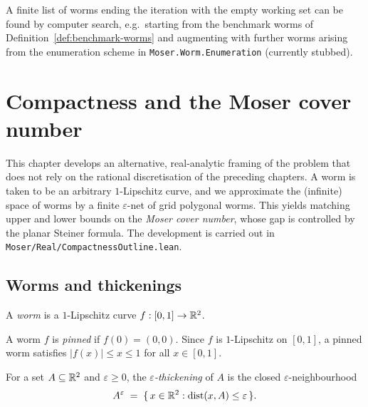 \begin{proposition}
  \label{prop:terminating-sequence}
  A finite list of worms ending the iteration with the empty working
  set can be found by computer search, e.g.\ starting from the
  benchmark worms of Definition~\ref{def:benchmark-worms} and augmenting
  with further worms arising from the enumeration scheme in
  \texttt{Moser.Worm.Enumeration} (currently stubbed).
\end{proposition}

\chapter{Compactness and the Moser cover number}

This chapter develops an alternative, real-analytic framing of the problem
that does not rely on the rational discretisation of the preceding chapters.
A worm is taken to be an arbitrary $1$-Lipschitz curve, and we approximate
the (infinite) space of worms by a finite $\varepsilon$-net of grid
polygonal worms. This yields matching upper and lower bounds on the
\emph{Moser cover number}, whose gap is controlled by the planar Steiner
formula. The development is carried out in
\texttt{Moser/Real/CompactnessOutline.lean}.

\section{Worms and thickenings}

\begin{definition}
    \label{def:lipschitz-worm}
    A \emph{worm} is a $1$-Lipschitz curve $f : [0,1] \to \mathbb{R}^2$.
\end{definition}

\begin{definition}
    \label{def:pinnedWorm}
    A worm $f$ is \emph{pinned} if $f(0) = (0,0)$. Since $f$ is $1$-Lipschitz
    on $[0,1]$, a pinned worm satisfies $\lvert f(x) \rvert \le x \le 1$ for
    all $x \in [0,1]$.
\end{definition}

\begin{definition}
    \label{def:thickening}
    For a set $A \subseteq \mathbb{R}^2$ and $\varepsilon \ge 0$, the
    \emph{$\varepsilon$-thickening} of $A$ is the closed
    $\varepsilon$-neighbourhood
    \[
        A^{\varepsilon} \;=\; \{\, x \in \mathbb{R}^2 : \operatorname{dist}(x, A) \le \varepsilon \,\}.
    \]
\end{definition}

